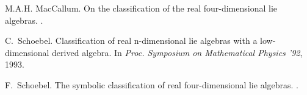 \begin{thebibliography}{1}

M.A.H. MacCallum.
\newblock On the classification of the real four-dimensional lie algebras.
.

C.~Schoebel.
\newblock Classification of real n-dimensional lie algebras with a
  low-dimensional derived algebra.
\newblock In {\em Proc. {Symposium on Mathematical Physics} '92}, 1993.

F.~Schoebel.
\newblock The symbolic classification of real four-dimensional lie algebras.
.

\end{thebibliography}

